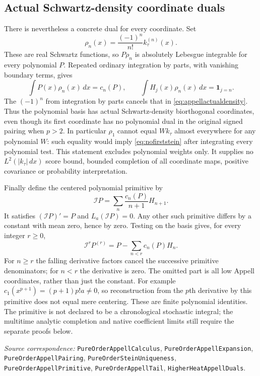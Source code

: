 \documentclass[11pt]{article}
\theoremstyle{remark}\newtheorem{remark}[theorem]{Remark}
\newcommand{\code}[1]{{\small\nolinkurl{#1}}}
\begin{document}
\subsection*{Actual Schwartz-density coordinate duals}
There is nevertheless a concrete dual for every coordinate. Set
\begin{equation}\label{eq:appellactualdensity}
 \rho_n(x)=\frac{(-1)^n}{n!}k_\tau^{(n)}(x).
\end{equation}
These are real Schwartz functions, so $P\rho_n$ is absolutely
Lebesgue integrable for every polynomial $P$. Repeated ordinary
integration by parts, with vanishing boundary terms, gives
\begin{equation}\label{eq:appellbiorthogonal}
 \int P(x)\rho_n(x)\,dx=c_n(P),\qquad
 \int H_j(x)\rho_n(x)\,dx=\mathbf1_{j=n}.
\end{equation}
The $(-1)^n$ from integration by parts cancels that in
\eqref{eq:appellactualdensity}. Thus the polynomial basis has actual
Schwartz-density biorthogonal coordinates, even though its first
coordinate has no polynomial dual in the original signed pairing
when $p>2$. In particular $\rho_1$ cannot equal $Wk_\tau$ almost
everywhere for any polynomial $W$: such equality would imply
\eqref{eq:nofirststein} after integrating every polynomial test.
This statement excludes polynomial weights only. It supplies no
$L^2(|k_\tau|\,dx)$ score bound, bounded completion of all coordinate
maps, positive covariance or probability interpretation.


Finally define the centered polynomial primitive by
\[
 \mathcal I P=\sum_n\frac{c_n(P)}{n+1}H_{n+1}.
\]
It satisfies $(\mathcal I P)'=P$ and $L_a(\mathcal I P)=0$.
Any other such primitive differs by a constant with mean zero, hence
by zero. Testing on the basis gives, for every integer $r\geq0$,
\[
 \mathcal I^r P^{(r)}=P-\sum_{n<r}c_n(P)H_n.
\]
For $n\geq r$ the falling derivative factors cancel the successive
primitive denominators; for $n<r$ the derivative is zero. The omitted
part is all low Appell coordinates, rather than just the constant.
For example $c_1(x^{p+1})=(p+1)p!a\ne0$, so reconstruction from the
$p$th derivative by this primitive does not equal mere centering.
These are finite polynomial identities. The primitive is not declared
to be a chronological stochastic integral; the multitime analytic
completion and native coefficient limits still require the separate
proofs below.

\par\smallskip\begingroup\small\raggedright
\textit{Source correspondence:} \code{PureOrderAppellCalculus},
\code{PureOrderAppellExpansion}, \code{PureOrderAppellPairing},
\code{PureOrderSteinUniqueness}, \code{PureOrderAppellPrimitive},
\code{PureOrderAppellTail}, \code{HigherHeatAppellDuals}.
\par\endgroup
\end{document}
